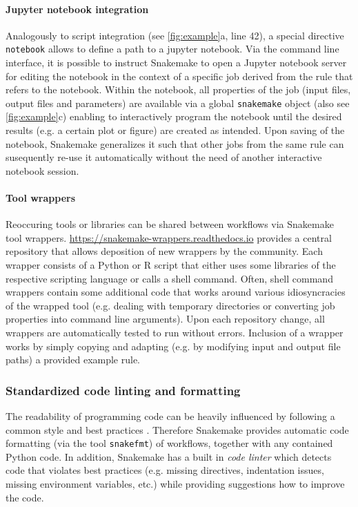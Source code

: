 \documentclass[parskip=half]{scrartcl}
\let\plainurl\url
\renewcommand{\url}[1]{\protect\plainurl{#1}}
\begin{document}
\paragraph{Jupyter notebook integration}
Analogously to script integration (see \autoref{fig:example}a, line 42), a special directive \lstinline!notebook! allows to define a path to a jupyter notebook.
Via the command line interface, it is possible to instruct Snakemake to open a Jupyter notebook server for editing the notebook in the context of a specific job derived from the rule that refers to the notebook.
Within the notebook, all properties of the job (input files, output files and parameters) are available via a global \lstinline!snakemake! object (also see \autoref{fig:example}c) enabling to interactively program the notebook until the desired results (e.g. a certain plot or figure) are created as intended.
Upon saving of the notebook, Snakemake generalizes it such that other jobs from the same rule can susequently re-use it automatically without the need of another interactive notebook session.

\paragraph{Tool wrappers}
Reoccuring tools or libraries can be shared between workflows via Snakemake tool wrappers.
\url{https://snakemake-wrappers.readthedocs.io} provides a central repository that allows deposition of new wrappers by the community.
Each wrapper consists of a Python or R script that either uses some libraries of the respective scripting language or calls a shell command.
Often, shell command wrappers contain some additional code that works around various idiosyncracies of the wrapped tool (e.g. dealing with temporary directories or converting job properties into command line arguments).
Upon each repository change, all wrappers are automatically tested to run without errors.
Inclusion of a wrapper works by simply copying and adapting (e.g. by modifying input and output file paths) a provided example rule.

\subsubsection{Standardized code linting and formatting}

The readability of programming code can be heavily influenced by following a common style and best practices \parencite{tysell_sundkvist_code_2017}.
Therefore Snakemake provides automatic code formatting (via the tool \lstinline!snakefmt!) of workflows, together with any contained Python code.
In addition, Snakemake has a built in \emph{code linter} which detects code that violates best practices (e.g. missing directives, indentation issues, missing environment variables, etc.) while providing suggestions how to improve the code.
\end{document}
